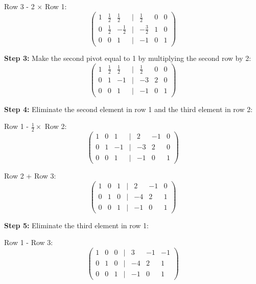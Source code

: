 Row 3 - 2 $\times$ Row 1:
\begin{equation*}
\begin{pmatrix}
1 & \frac{1}{2} & \frac{1}{2} & | & \frac{1}{2} & 0 & 0 \\
0 & \frac{1}{2} & -\frac{1}{2} & | & -\frac{3}{2} & 1 & 0 \\
0 & 0 & 1 & | & -1 & 0 & 1
\end{pmatrix}
\end{equation*}

\textbf{Step 3:} Make the second pivot equal to 1 by multiplying the second row by 2:
\begin{equation*}
\begin{pmatrix}
1 & \frac{1}{2} & \frac{1}{2} & | & \frac{1}{2} & 0 & 0 \\
0 & 1 & -1 & | & -3 & 2 & 0 \\
0 & 0 & 1 & | & -1 & 0 & 1
\end{pmatrix}
\end{equation*}

\textbf{Step 4:} Eliminate the second element in row 1 and the third element in row 2:

Row 1 - $\frac{1}{2} \times$ Row 2:
\begin{equation*}
\begin{pmatrix}
1 & 0 & 1 & | & 2 & -1 & 0 \\
0 & 1 & -1 & | & -3 & 2 & 0 \\
0 & 0 & 1 & | & -1 & 0 & 1
\end{pmatrix}
\end{equation*}

Row 2 + Row 3:
\begin{equation*}
\begin{pmatrix}
1 & 0 & 1 & | & 2 & -1 & 0 \\
0 & 1 & 0 & | & -4 & 2 & 1 \\
0 & 0 & 1 & | & -1 & 0 & 1
\end{pmatrix}
\end{equation*}

\textbf{Step 5:} Eliminate the third element in row 1:

Row 1 - Row 3:
\begin{equation*}
\begin{pmatrix}
1 & 0 & 0 & | & 3 & -1 & -1 \\
0 & 1 & 0 & | & -4 & 2 & 1 \\
0 & 0 & 1 & | & -1 & 0 & 1
\end{pmatrix}
\end{equation*}

